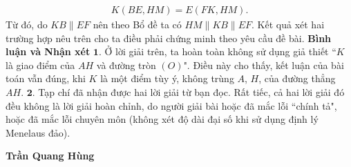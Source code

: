 \begin{multicols}{2}
	\begin{align*}
		K\left( {BE,HM} \right) = E\left( {FK,HM} \right).
	\end{align*}
	Từ đó, do $KB \parallel EF$ nên theo Bổ đề ta có $HM \parallel KB \parallel EF$.
	\vskip 0.05cm
	Kết quả xét hai trường hợp nêu trên cho ta điều phải chứng minh theo yêu cầu đề bài.
	\vskip 0.05cm
	\textbf{\color{thachthuctoanhoc}\color{thachthuctoanhoc}Bình luận và Nhận xét}
	\vskip 0.05cm
	$\pmb{1.}$ Ở lời giải trên, ta hoàn toàn không sử dụng giả thiết ``$K$ là giao điểm của $AH$ và đường tròn $(O)$". Điều này cho thấy, kết luận của bài toán vẫn đúng, khi $K$ là một điểm tùy ý, không trùng $A$, $H$, của đường thẳng $AH.$
	\vskip 0.05cm
	$\pmb{2.}$ Tạp chí đã nhận được hai lời giải từ bạn đọc. Rất tiếc, cả hai lời giải đó đều không là lời giải hoàn chỉnh, do người giải bài hoặc đã mắc lỗi ``chính tả", hoặc đã mắc lỗi chuyên môn (không xét độ dài đại số khi sử dụng định lý Menelaus đảo).
	\begin{flushright}
		\textbf{\color{thachthuctoanhoc}\color{thachthuctoanhoc}
			Trần Quang Hùng}
	\end{flushright}
\end{multicols}